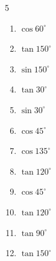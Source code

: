 \begin{multicols}{5}
\begin{enumerate}
        \phantom{$\displaystyle =1$}

  \item $\displaystyle \cos{60^\circ}$


  \item $\displaystyle \tan{150^\circ}$


  \item $\displaystyle \sin{150^\circ}$


  \item $\displaystyle \tan{30^\circ}$


  \item $\displaystyle \sin{30^\circ}$


  \item $\displaystyle \cos{45^\circ}$


  \item $\displaystyle \cos{135^\circ}$


\columnbreak %

  \item $\displaystyle \tan{120^\circ}$


  \item $\displaystyle \cos{45^\circ}$


  \item $\displaystyle \tan{120^\circ}$


  \item $\displaystyle \tan{90^\circ}$

        \phantom{$\displaystyle なし$}

  \item $\displaystyle \tan{150^\circ}$



\end{enumerate}
\end{multicols}
